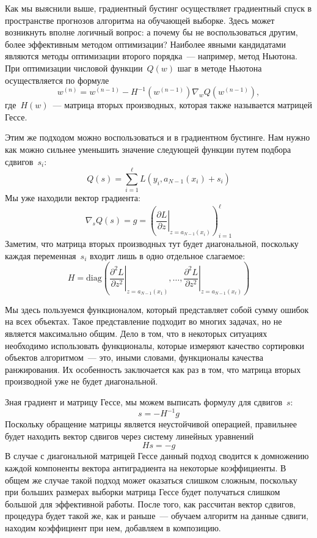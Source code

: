 \documentclass[12pt,fleqn]{article}
\begin{document}
Как мы выяснили выше, градиентный бустинг осуществляет градиентный спуск в пространстве
прогнозов алгоритма на обучающей выборке.
Здесь может возникнуть вполне логичный вопрос: а почему бы не воспользоваться другим,
более эффективным методом оптимизации?
Наиболее явными кандидатами являются методы оптимизации второго порядка~--- например, метод Ньютона.
При оптимизации числовой функции~$Q(w)$ шаг в методе Ньютона осуществляется по формуле
\[
    w^{(n)}
    =
    w^{(n - 1)}
    -
    H^{-1}(w^{(n - 1)})
    \nabla_w Q(w^{(n - 1)}),
\]
где~$H(w)$~--- матрица вторых производных, которая также называется матрицей Гессе.

Этим же подходом можно воспользоваться и в градиентном бустинге.
Нам нужно как можно сильнее уменьшить значение следующей функции путем подбора
сдвигов~$s_i$:
\[
    Q(s)
    =
    \sum_{i = 1}^{\ell}
        L(y_i, a_{N - 1}(x_i) + s_i)
\]
Мы уже находили вектор градиента:
\[
    \nabla_s Q(s)
    =
    g
    =
    \left(
        \left.
        \frac{\partial L}{\partial z}
        \right|_{z = a_{N - 1}(x_i)}
    \right)_{i = 1}^{\ell}
\]
Заметим, что матрица вторых производных тут будет диагональной, поскольку
каждая переменная~$s_i$ входит лишь в одно отдельное слагаемое:
\[
    H
    =
    \text{diag} \left(
        \left.
        \frac{\partial^2 L}{\partial z^2}
        \right|_{z = a_{N - 1}(x_1)},
        \dots,
        \left.
        \frac{\partial^2 L}{\partial z^2}
        \right|_{z = a_{N - 1}(x_\ell)}
    \right)
\]

Мы здесь пользуемся функционалом, который представляет собой сумму ошибок на всех объектах.
Такое представление подходит во многих задачах, но не является максимально общим.
Дело в том, что в некоторых ситуациях необходимо использовать функционалы,
которые измеряют качество сортировки объектов алгоритмом~--- это, иными словами,
функционалы качества ранжирования.
Их особенность заключается как раз в том, что матрица вторых производной уже не будет
диагональной.

Зная градиент и матрицу Гессе, мы можем выписать формулу для сдвигов~$s$:
\[
    s
    =
    -H^{-1}
    g
\]
Поскольку обращение матрицы является неустойчивой операцией, правильнее будет
находить вектор сдвигов через систему линейных уравнений
\[
    Hs
    =
    -g
\]
В случае с диагональной матрицей Гессе данный подход сводится к домножению каждой компоненты
вектора антиградиента на некоторые коэффициенты.
В общем же случае такой подход может оказаться слишком сложным, поскольку при больших размерах выборки
матрица Гессе будет получаться слишком большой для эффективной работы.
После того, как рассчитан вектор сдвигов, процедура будет такой же, как и раньше~--- обучаем алгоритм
на данные сдвиги, находим коэффициент при нем, добавляем в композицию.
\end{document}
